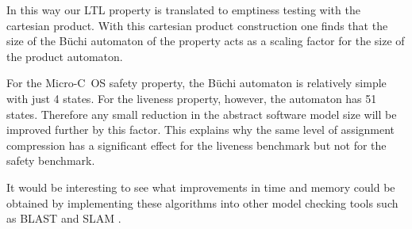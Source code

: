 In this way our LTL property is translated to emptiness testing with
the cartesian product.  With this cartesian product construction one
finds that the size of the B\"uchi automaton of the property acts as a
scaling factor for the size of the product automaton.

For the Micro-C~OS safety property, the B\"uchi automaton is relatively
simple with just 4 states.  For the liveness property, however, the
automaton has 51 states.  Therefore any small reduction in the abstract
software model size will be improved further by this factor.  This
explains why the same level of assignment compression has a
significant effect for the liveness benchmark but not for the safety
benchmark.

It would be interesting to see what improvements in time and memory
could be obtained by implementing these algorithms into other model
checking tools such as BLAST \cite{website:blast} and SLAM
\cite{slam}.
